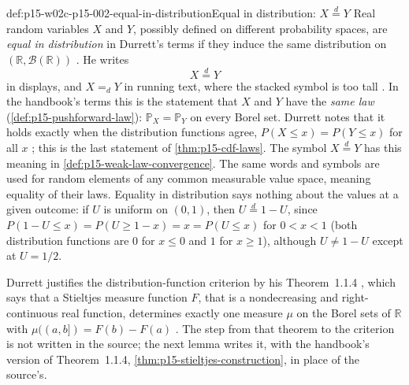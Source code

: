 \begin{hbconvention}{def:p15-w02c-p15-002-equal-in-distribution}{Equal in distribution: \(X\stackrel{d}{=}Y\)}
Real random variables \(X\) and \(Y\), possibly defined on different
probability spaces, are \emph{equal in distribution} in Durrett's terms if
they induce the same distribution on \((\mathbb R,\mathcal B(\mathbb R))\)
\cite[p.~11]{DurrettPTEAuthor2019}. He writes
\[
 X\stackrel{d}{=}Y
\]
in displays, and \(X=_dY\) in running text, where the stacked symbol is
too tall \cite[p.~12]{DurrettPTEAuthor2019}. In the handbook's terms this
is the statement that \(X\) and \(Y\) have the \emph{same law}
(\cref{def:p15-pushforward-law}): \(\mathbb P_X=\mathbb P_Y\) on every
Borel set. Durrett notes that it holds exactly when the distribution
functions agree, \(P(X\leq x)=P(Y\leq x)\) for all \(x\)
\cite[pp.~11--12]{DurrettPTEAuthor2019}; this is the last statement of
\cref{thm:p15-cdf-laws}. The symbol \(X\stackrel{d}{=}Y\) has this meaning
in \cref{def:p15-weak-law-convergence}. The same words and symbols are used for random
elements of any common measurable value space, meaning equality of their
laws. Equality in distribution says nothing about the values at a given
outcome: if \(U\) is uniform on \((0,1)\), then \(U\stackrel{d}{=}1-U\),
since \(P(1-U\leq x)=P(U\geq1-x)=x=P(U\leq x)\) for \(0<x<1\) (both
distribution functions are \(0\) for \(x\leq0\) and \(1\) for
\(x\geq1\)), although \(U\neq1-U\) except at \(U=1/2\).
\end{hbconvention}

Durrett justifies the distribution-function criterion by his
Theorem~1.1.4 \cite[p.~11]{DurrettPTEAuthor2019},
which says that a Stieltjes measure function \(F\), that is a nondecreasing
and right-continuous real function, determines exactly one measure
\(\mu\) on the Borel sets of \(\mathbb R\) with \(\mu((a,b])=F(b)-F(a)\)
\cite[thm.~1.1.4, p.~3]{DurrettPTEAuthor2019}. The step from that theorem
to the criterion is not written in the source; the next lemma writes it,
with the handbook's version of Theorem~1.1.4,
\cref{thm:p15-stieltjes-construction}, in place of the source's.

